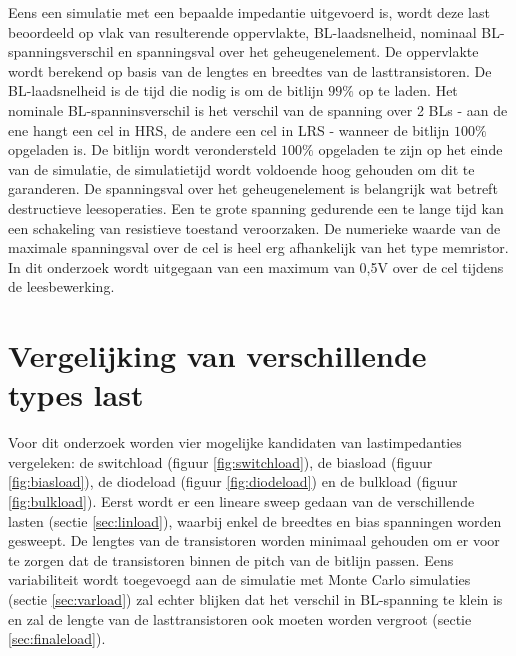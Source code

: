Eens een simulatie met een bepaalde impedantie uitgevoerd is, wordt deze last beoordeeld op vlak van resulterende oppervlakte, BL-laadsnelheid, nominaal BL-spanningsverschil en spanningsval over het geheugenelement. De oppervlakte wordt berekend op basis van de lengtes en breedtes van de lasttransistoren. De BL-laadsnelheid is de tijd die nodig is om de bitlijn $99\%$ op te laden. Het nominale BL-spanninsverschil is het verschil van de spanning over 2 BLs - aan de ene hangt een cel in HRS, de andere een cel in LRS - wanneer de bitlijn $100\%$ opgeladen is. De bitlijn wordt verondersteld $100\%$ opgeladen te zijn op het einde van de simulatie, de simulatietijd wordt voldoende hoog gehouden om dit te garanderen. De spanningsval over het geheugenelement is belangrijk wat betreft destructieve leesoperaties. Een te grote spanning gedurende een te lange tijd kan een schakeling van resistieve toestand veroorzaken. De numerieke waarde van de maximale spanningsval over de cel is heel erg afhankelijk van het type memristor. In dit onderzoek wordt uitgegaan van een maximum van 0,5V over de cel tijdens de leesbewerking\cite{ppt:model}.

\section{Vergelijking van verschillende types last}
Voor dit onderzoek worden vier mogelijke kandidaten van lastimpedanties vergeleken: de switchload (figuur \ref{fig:switchload}), de biasload (figuur \ref{fig:biasload}), de diodeload (figuur \ref{fig:diodeload}) en de bulkload (figuur \ref{fig:bulkload})\cite{bulkload}. Eerst wordt er een lineare sweep gedaan van de verschillende lasten (sectie \ref{sec:linload}), waarbij enkel de breedtes en bias spanningen worden gesweept. De lengtes van de transistoren worden minimaal gehouden om er voor te zorgen dat de transistoren binnen de pitch van de bitlijn passen. Eens variabiliteit wordt toegevoegd aan de simulatie met Monte Carlo simulaties (sectie \ref{sec:varload}) zal echter blijken dat het verschil in BL-spanning te klein is en zal de lengte van de lasttransistoren ook moeten worden vergroot (sectie \ref{sec:finaleload}).

